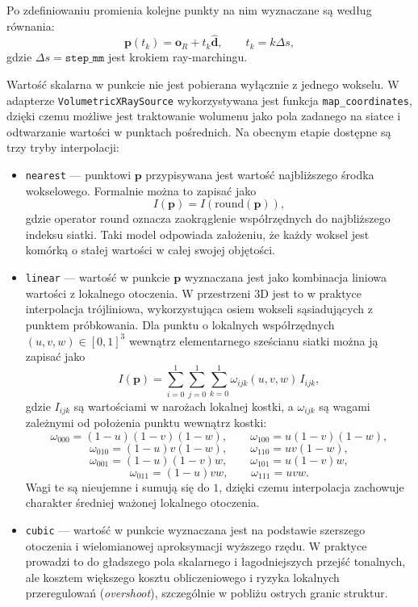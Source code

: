 \documentclass[11pt,a4paper]{article}
\begin{document}
Po zdefiniowaniu promienia kolejne punkty na nim wyznaczane są według równania:
\[
  \mathbf{p}(t_k)=\mathbf{o}_R+t_k\hat{\mathbf{d}},
  \qquad
  t_k = k\Delta s,
\]
gdzie \(\Delta s = \texttt{step\_mm}\) jest krokiem ray-marchingu.

Wartość skalarna w punkcie nie jest pobierana wyłącznie z jednego wokselu.
W adapterze \texttt{VolumetricXRaySource} wykorzystywana jest funkcja
\texttt{map\_coordinates}, dzięki czemu możliwe jest traktowanie wolumenu
jako pola zadanego na siatce i odtwarzanie wartości w punktach pośrednich.
Na obecnym etapie dostępne są trzy tryby interpolacji:
\begin{itemize}
\item \texttt{nearest} --- punktowi \(\mathbf{p}\) przypisywana jest wartość
      najbliższego środka wokselowego. Formalnie można to zapisać jako
      \[
        I(\mathbf{p}) = I(\mathrm{round}(\mathbf{p})),
      \]
      gdzie operator \(\mathrm{round}\) oznacza zaokrąglenie współrzędnych
      do najbliższego indeksu siatki. Taki model odpowiada założeniu, że każdy
      woksel jest komórką o stałej wartości w całej swojej objętości.
\item \texttt{linear} --- wartość w punkcie \(\mathbf{p}\) wyznaczana jest jako
      kombinacja liniowa wartości z lokalnego otoczenia. W przestrzeni 3D jest to
      w praktyce interpolacja trójliniowa, wykorzystująca osiem wokseli sąsiadujących
      z punktem próbkowania. Dla punktu o lokalnych współrzędnych
      \((u,v,w)\in[0,1]^3\) wewnątrz elementarnego sześcianu siatki można ją zapisać jako
      \[
        I(\mathbf{p}) =
        \sum_{i=0}^{1}\sum_{j=0}^{1}\sum_{k=0}^{1}
        \omega_{ijk}(u,v,w)\, I_{ijk},
      \]
      gdzie \(I_{ijk}\) są wartościami w narożach lokalnej kostki, a
      \(\omega_{ijk}\) są wagami zależnymi od położenia punktu wewnątrz kostki:
      \[
        \omega_{000}=(1-u)(1-v)(1-w), \qquad
        \omega_{100}=u(1-v)(1-w),
      \]
      \[
        \omega_{010}=(1-u)v(1-w), \qquad
        \omega_{110}=uv(1-w),
      \]
      \[
        \omega_{001}=(1-u)(1-v)w, \qquad
        \omega_{101}=u(1-v)w,
      \]
      \[
        \omega_{011}=(1-u)vw, \qquad
        \omega_{111}=uvw.
      \]
      Wagi te są nieujemne i sumują się do \(1\), dzięki czemu interpolacja zachowuje
      charakter średniej ważonej lokalnego otoczenia.
\item \texttt{cubic} --- wartość w punkcie wyznaczana jest na podstawie szerszego
      otoczenia i wielomianowej aproksymacji wyższego rzędu. W praktyce prowadzi to
      do gładszego pola skalarnego i łagodniejszych przejść tonalnych, ale kosztem
      większego kosztu obliczeniowego i ryzyka lokalnych przeregulowań
      (\emph{overshoot}), szczególnie w pobliżu ostrych granic struktur.
\end{itemize}
\end{document}
